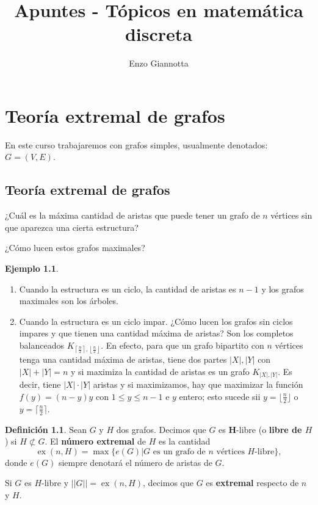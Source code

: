 \documentclass[12pt]{report}
\title{Apuntes - Tópicos en matemática discreta}
\author{Enzo Giannotta}
\theoremstyle{plain}
\theoremstyle{definition}
\newtheorem{definition}[theorem]{Definición}
\newtheorem{example}[theorem]{Ejemplo}
\newcommand{\abs}[1]{\left \vert #1 \right \vert}
\newcommand{\Abs}[1]{\left \vert \left \vert #1 \right \vert \right \vert}
\newcommand{\ceil}[1]{\left\lceil #1  \right\rceil}
\newcommand{\floor}[1]{\left\lfloor #1  \right\rfloor}
\newcommand{\ex}[2]{\operatorname{ex} (#1, #2)}
\begin{document}
\maketitle


\tableofcontents







\chapter{Teoría extremal de grafos}

En este curso trabajaremos con grafos simples, usualmente denotados: $G=(V,E)$.

\section{Teoría extremal de grafos}

¿Cuál es la máxima cantidad de aristas que puede tener un grafo de $n$ vértices sin que aparezca una cierta estructura?

¿Cómo lucen estos grafos maximales?

\begin{example}
\begin{enumerate}
\item Cuando la estructura es un ciclo, la cantidad de aristas es $n-1$ y los grafos maximales son los árboles.
\item Cuando la estructura es un ciclo impar. ¿Cómo lucen los grafos sin ciclos impares y que tienen una cantidad máxima de aristas? Son los completos balanceados $K_{\ceil {\frac n 2},\floor{\frac n 2}}$. En efecto, para que un grafo bipartito con $n$ vértices tenga una cantidad máxima de aristas, tiene dos partes $\abs X, \abs Y$ con $\abs X + \abs Y = n$ y si maximiza la cantidad de aristas es un grafo $K_{\abs X, \abs Y}$. Es decir, tiene $\abs X \cdot \abs Y$ aristas y si maximizamos, hay que maximizar la función $f(y) = (n-y)y$ con $1 \leq y \leq n-1$ e $y$ entero; esto sucede sii $y = \lfloor {\frac n 2} \rfloor$ o $y = \lceil \frac n 2 \rceil$.
\end{enumerate}
\end{example}

\begin{definition}
Sean $G$ y $H$ dos grafos. Decimos que $G$ es \textbf{H}-libre (o \textbf{libre de $H$}) si $H \not \subset G$. El \textbf{número extremal} de $H$ es la cantidad
\[
    \ex n H = \max \{e (G) | G \text{ es un grafo de $n$ vértices $H$-libre}\},
\]
donde $e(G)$ siempre denotará el número de aristas de $G$.

Si $G$ es $H$-libre y $\Abs G = \ex n H$, decimos que $G$ es \textbf{extremal} respecto de $n$ y $H$.
\end{definition}
\end{document}
